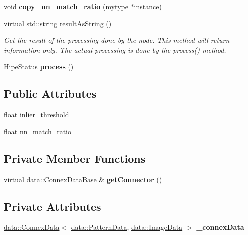 \begin{DoxyCompactItemize}
void {\bfseries copy\+\_\+nn\+\_\+match\+\_\+ratio} (\hyperlink{classfilter_1_1algos_1_1_akaze}{mytype} $\ast$instance)
\item 
virtual std\+::string \hyperlink{classfilter_1_1algos_1_1_akaze_afbbbf680eb0c14ea7e47dbc78169f32b}{result\+As\+String} ()
\begin{DoxyCompactList}\small\item\em Get the result of the processing done by the node. This method will return information only. The actual processing is done by the process() method. \end{DoxyCompactList}\item 
\mbox{\label{classfilter_1_1algos_1_1_akaze_a3b23c1d178f81797319dffebbbb77742}} 
Hipe\+Status {\bfseries process} ()
\end{DoxyCompactItemize}
\subsection*{Public Attributes}
\begin{DoxyCompactItemize}
\item 
float \hyperlink{classfilter_1_1algos_1_1_akaze_aee53a5f3f06ed8c533dc4d421115fe6a}{inlier\+\_\+threshold}
\item 
float \hyperlink{classfilter_1_1algos_1_1_akaze_a114bb2fea06317e4b7c5ba620dd8d3c4}{nn\+\_\+match\+\_\+ratio}
\end{DoxyCompactItemize}
\subsection*{Private Member Functions}
\begin{DoxyCompactItemize}
\item 
\mbox{\label{classfilter_1_1algos_1_1_akaze_ae85baf6c729c6e0c9a9ec88cbbb95e7b}} 
virtual \hyperlink{classfilter_1_1data_1_1_connex_data_base}{data\+::\+Connex\+Data\+Base} \& {\bfseries get\+Connector} ()
\end{DoxyCompactItemize}
\subsection*{Private Attributes}
\begin{DoxyCompactItemize}
\item 
\mbox{\label{classfilter_1_1algos_1_1_akaze_a87f159575ac795211b9af8452bf0a1e5}} 
\hyperlink{classfilter_1_1data_1_1_connex_data}{data\+::\+Connex\+Data}$<$ \hyperlink{classfilter_1_1data_1_1_pattern_data}{data\+::\+Pattern\+Data}, \hyperlink{classfilter_1_1data_1_1_image_data}{data\+::\+Image\+Data} $>$ {\bfseries \+\_\+connex\+Data}
\end{DoxyCompactItemize}

